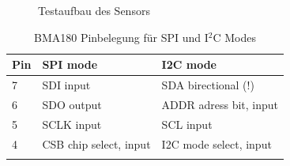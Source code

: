 \documentclass[12pt,a4paper]{scrartcl}
\begin{document}
\begin{figure}[htb]
	\centering
	\caption{Testaufbau des Sensors}
	\label{testaufbaufigure}
\end{figure}


\begin{table}[htb]
\begin{tabular}{@{}lll@{}}      
    	\cmidrule(r){1-2}\morecmidrules\cmidrule(r){1-2}
       	Pin & SPI mode & I2C mode\\
      	\midrule
 	7 & SDI input & SDA birectional (!) \\ 
 	6 & SDO output & ADDR adress bit, input \\
 	5 & SCLK input & SCL input \\
 	4 & CSB chip select, input & I2C mode select, input \\
 	 \addlinespace
 	 \bottomrule
 \end{tabular}
\caption{BMA180 Pinbelegung für SPI und I$^2$C Modes \citep{Sensortec:2009rt}}
\label{i2cmode}
\end{table}
\end{document}
